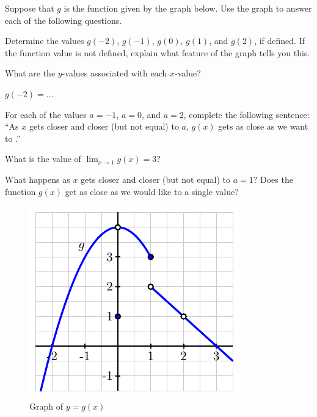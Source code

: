 \documentclass{ximera}
\begin{document}
\begin{question}
Suppose that $g$ is the function given by the graph below.  Use the graph to answer each of the following questions.

Determine the values $g(-2)$, $g(-1)$, $g(0)$, $g(1)$, and $g(2)$, if defined.  If the function value is not defined, explain what feature of the graph tells you this.
\begin{solution}
\begin{hint}
What are the $y$-values associated with each $x$-value?
\end{hint}
\begin{freeResponse}
$g(-2)=...$
\end{freeResponse}
\end{solution} 

For each of the values $a = -1$, $a = 0$, and $a = 2$, complete the following sentence: ``As $x$ gets closer and closer (but not equal) to $a$, $g(x)$ gets as close as we want to \underline{\hspace{0.3in}}.''
\begin{solution}
\begin{freeResponse}
%
\end{freeResponse}
\end{solution} 

What is the value of $\lim_{x\to1}g(x)=3$?
\begin{multipleChoice}
\end{multipleChoice}
\begin{solution}
\begin{hint}
What happens as $x$ gets closer and closer (but not equal) to $a = 1$?  Does the function $g(x)$ get as close as we would like to a single value?
\end{hint}
\end{solution} 

\begin{figure}[h]
\begin{center}
\includegraphics{figures/1_2_PA1.pdf} 
\caption{Graph of $y = g(x)$} \label{F:1.2.PA1}
\end{center}
\end{figure}

\end{question}
\end{document}
